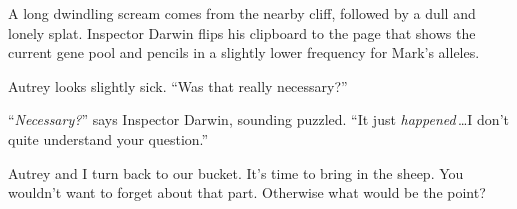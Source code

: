 {
 A long dwindling scream comes from the nearby cliff, followed by a
dull and lonely splat. Inspector Darwin flips his clipboard to the page
that shows the current gene pool and pencils in a slightly lower
frequency for Mark's alleles.}

{
 Autrey looks slightly sick. ``Was that really
necessary?''}

{
 ``\textit{Necessary?}'' says
Inspector Darwin, sounding puzzled. ``It just
\textit{happened}\,\ldots I don't quite understand your
question.''}

{
 Autrey and I turn back to our bucket. It's time to
bring in the sheep. You wouldn't want to forget about
that part. Otherwise what would be the point?}

\myendsectiontext



